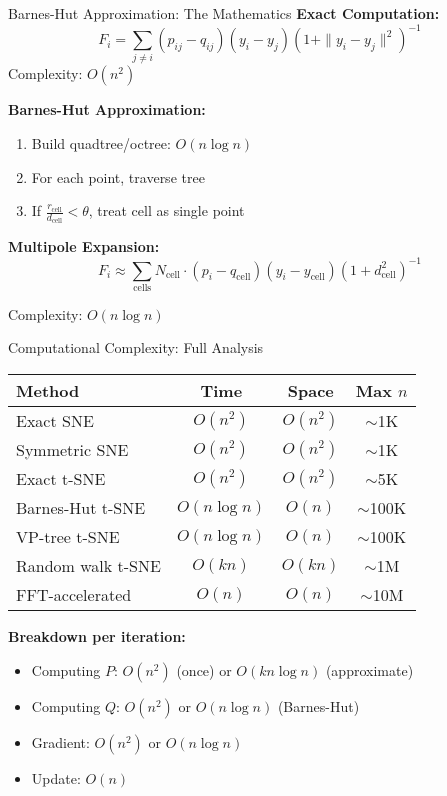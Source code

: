 \begin{frame}{Barnes-Hut Approximation: The Mathematics}
\textbf{Exact Computation:}
$$F_i = \sum_{j \neq i} (p_{ij} - q_{ij})(y_i - y_j)(1 + \|y_i - y_j\|^2)^{-1}$$
Complexity: $O(n^2)$

\textbf{Barnes-Hut Approximation:}
\begin{enumerate}
\item Build quadtree/octree: $O(n \log n)$
\item For each point, traverse tree
\item If $\frac{r_{\text{cell}}}{d_{\text{cell}}} < \theta$, treat cell as single point
\end{enumerate}

\textbf{Multipole Expansion:}
$$F_i \approx \sum_{\text{cells}} N_{\text{cell}} \cdot (p_i - q_{\text{cell}})(y_i - y_{\text{cell}})(1 + d_{\text{cell}}^2)^{-1}$$

Complexity: $O(n \log n)$

\end{frame}

\begin{frame}{Computational Complexity: Full Analysis}
\begin{center}
\begin{tabular}{l|c|c|c}
\textbf{Method} & \textbf{Time} & \textbf{Space} & \textbf{Max $n$} \\
\hline
Exact SNE & $O(n^2)$ & $O(n^2)$ & $\sim$1K \\
Symmetric SNE & $O(n^2)$ & $O(n^2)$ & $\sim$1K \\
Exact t-SNE & $O(n^2)$ & $O(n^2)$ & $\sim$5K \\
Barnes-Hut t-SNE & $O(n \log n)$ & $O(n)$ & $\sim$100K \\
VP-tree t-SNE & $O(n \log n)$ & $O(n)$ & $\sim$100K \\
Random walk t-SNE & $O(kn)$ & $O(kn)$ & $\sim$1M \\
FFT-accelerated & $O(n)$ & $O(n)$ & $\sim$10M \\
\end{tabular}
\end{center}

\textbf{Breakdown per iteration:}
\begin{itemize}
\item Computing $P$: $O(n^2)$ (once) or $O(kn \log n)$ (approximate)
\item Computing $Q$: $O(n^2)$ or $O(n \log n)$ (Barnes-Hut)
\item Gradient: $O(n^2)$ or $O(n \log n)$
\item Update: $O(n)$
\end{itemize}
\end{frame}

